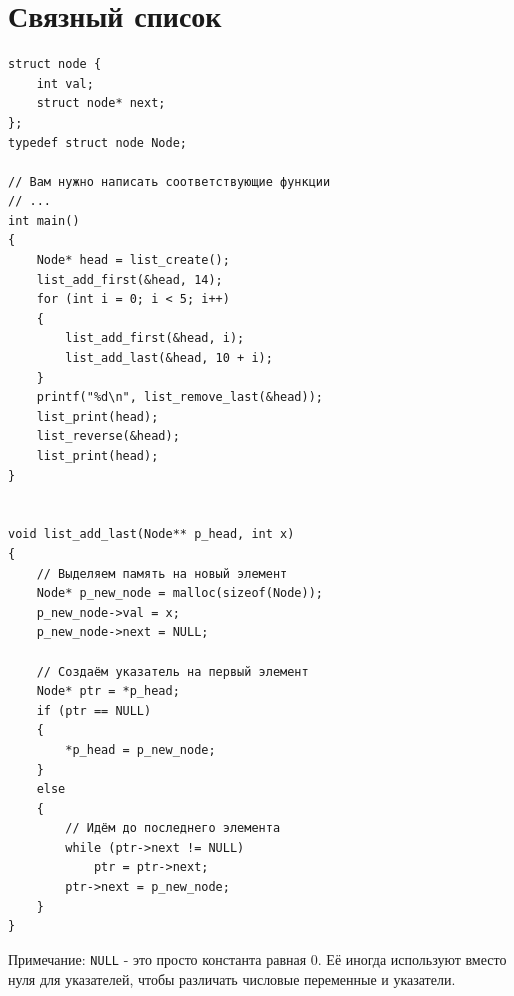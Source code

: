 \documentclass{article}
\begin{document}
\section*{Связный список}
\begin{multicols}{2}
\begin{lstlisting}
struct node {
    int val;
    struct node* next;
};
typedef struct node Node;

// Вам нужно написать соответствующие функции
// ...
int main()
{
    Node* head = list_create();
    list_add_first(&head, 14);
    for (int i = 0; i < 5; i++)
    {
        list_add_first(&head, i);
        list_add_last(&head, 10 + i); 
    }
    printf("%d\n", list_remove_last(&head));
    list_print(head);
    list_reverse(&head);
    list_print(head);
}


void list_add_last(Node** p_head, int x)
{
    // Выделяем память на новый элемент
    Node* p_new_node = malloc(sizeof(Node));
    p_new_node->val = x;
    p_new_node->next = NULL;
    
    // Создаём указатель на первый элемент
    Node* ptr = *p_head;
    if (ptr == NULL)
    {
        *p_head = p_new_node;
    }
    else
    {
        // Идём до последнего элемента
        while (ptr->next != NULL)
            ptr = ptr->next;
        ptr->next = p_new_node;
    }
}   
\end{lstlisting}
\begin{center}
\end{center}
\end{multicols}
Примечание: \texttt{NULL} - это просто константа равная 0. Её иногда используют вместо нуля для указателей, чтобы различать числовые переменные и указатели.
\newpage
\end{document}
